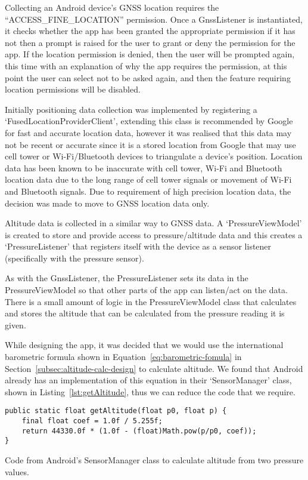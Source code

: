 Collecting an Android device's GNSS location requires the ``ACCESS\_FINE\_LOCATION'' permission. Once a GnssListener is instantiated, it checks whether the app has been granted the appropriate permission if it has not then a prompt is raised for the user to grant or deny the permission for the app. If the location permission is denied, then the user will be prompted again, this time with an explanation of why the app requires the permission, at this point the user can select not to be asked again, and then the feature requiring location permissions will be disabled.

Initially positioning data collection was implemented by registering a `FusedLocationProviderClient', extending this class is recommended by Google for fast and accurate location data, however it was realised that this data may not be recent or accurate since it is a stored location from Google that may use cell tower or Wi-Fi/Bluetooth devices to triangulate a device's position. Location data has been known to be inaccurate with cell tower, Wi-Fi and Bluetooth location data due to the long range of cell tower signals or movement of Wi-Fi and Bluetooth signals. Due to requirement of high precision location data, the decision was made to move to GNSS location data only.

Altitude data is collected in a similar way to GNSS data. A `PressureViewModel' is created to store and provide access to pressure/altitude data and this creates a `PressureListener' that registers itself with the device as a sensor listener (specifically with the pressure sensor).

As with the GnssListener, the PressureListener sets its data in the PressureViewModel so that other parts of the app can listen/act on the data. There is a small amount of logic in the PressureViewModel class that calculates and stores the altitude that can be calculated from the pressure reading it is given.

While designing the app, it was decided that we would use the international barometric formula shown in Equation~\ref{eq:barometric-fomula} in Section~\ref{subsec:altitude-calc-design} to calculate altitude. We found that Android already has an implementation of this equation in their `SensorManager' class, shown in Listing~\vref{lst:getAltitude}, thus we can reduce the code that we require.

\begin{listing*}
  \centering
  \begin{verbatim}
public static float getAltitude(float p0, float p) {
    final float coef = 1.0f / 5.255f;
    return 44330.0f * (1.0f - (float)Math.pow(p/p0, coef));
}
  \end{verbatim}
  \caption{Code from Android's SensorManager class to calculate altitude from two pressure values.~\cite{_android_????-1}}\label{lst:getAltitude}
\end{listing*}

